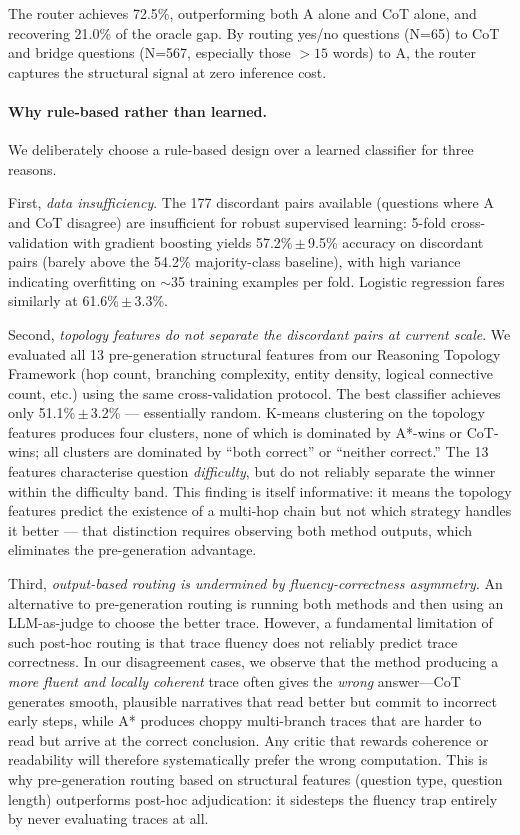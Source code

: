 \documentclass{article}
\begin{document}
The router achieves 72.5\%, outperforming both A\* alone and CoT alone, and recovering 21.0\% of the oracle gap. By routing yes/no questions (N=65) to CoT and bridge questions (N=567, especially those $>15$ words) to A\*, the router captures the structural signal at zero inference cost.

\paragraph{Why rule-based rather than learned.}
We deliberately choose a rule-based design over a learned classifier for three reasons.

First, \emph{data insufficiency}. The 177 discordant pairs available (questions where A\* and CoT disagree) are insufficient for robust supervised learning: 5-fold cross-validation with gradient boosting yields 57.2\%\,$\pm$\,9.5\% accuracy on discordant pairs (barely above the 54.2\% majority-class baseline), with high variance indicating overfitting on $\sim$35 training examples per fold. Logistic regression fares similarly at 61.6\%\,$\pm$\,3.3\%.

Second, \emph{topology features do not separate the discordant pairs at current scale}. We evaluated all 13 pre-generation structural features from our Reasoning Topology Framework (hop count, branching complexity, entity density, logical connective count, etc.) using the same cross-validation protocol. The best classifier achieves only 51.1\%\,$\pm$\,3.2\% --- essentially random. K-means clustering on the topology features produces four clusters, none of which is dominated by A*-wins or CoT-wins; all clusters are dominated by ``both correct'' or ``neither correct.'' The 13 features characterise question \emph{difficulty}, but do not reliably separate the winner within the difficulty band. This finding is itself informative: it means the topology features predict the existence of a multi-hop chain but not which strategy handles it better --- that distinction requires observing both method outputs, which eliminates the pre-generation advantage.

Third, \emph{output-based routing is undermined by fluency-correctness asymmetry}. An alternative to pre-generation routing is running both methods and then using an LLM-as-judge to choose the better trace. However, a fundamental limitation of such post-hoc routing is that trace fluency does not reliably predict trace correctness. In our disagreement cases, we observe that the method producing a \emph{more fluent and locally coherent} trace often gives the \emph{wrong} answer---CoT generates smooth, plausible narratives that read better but commit to incorrect early steps, while A* produces choppy multi-branch traces that are harder to read but arrive at the correct conclusion. Any critic that rewards coherence or readability will therefore systematically prefer the wrong computation. This is why pre-generation routing based on structural features (question type, question length) outperforms post-hoc adjudication: it sidesteps the fluency trap entirely by never evaluating traces at all.
\end{document}
